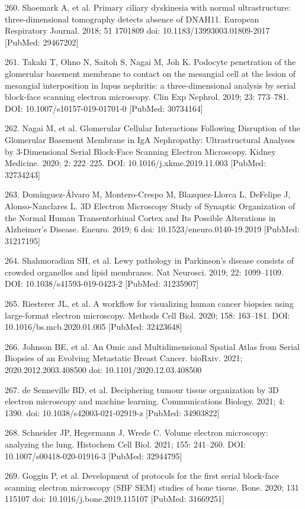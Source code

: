 \documentclass{article}
\begin{document}
\begin{hangpars}
260. Shoemark A, et al. Primary ciliary dyskinesia with normal ultrastructure: three-dimensional tomography detects absence of DNAH11. European Respiratory Journal. 2018; 51 1701809 doi: 10.1183/13993003.01809-2017 [PubMed: 29467202]

261. Takaki T, Ohno N, Saitoh S, Nagai M, Joh K. Podocyte penetration of the glomerular basement membrane to contact on the mesangial cell at the lesion of mesangial interposition in lupus nephritis: a three-dimensional analysis by serial block-face scanning electron microscopy. Clin Exp Nephrol. 2019; 23: 773–781. DOI: 10.1007/s10157-019-01701-0 [PubMed: 30734164]

262. Nagai M, et al. Glomerular Cellular Interactions Following Disruption of the Glomerular Basement Membrane in IgA Nephropathy: Ultrastructural Analyses by 3-Dimensional Serial Block-Face Scanning Electron Microscopy. Kidney Medicine. 2020; 2: 222–225. DOI: 10.1016/j.xkme.2019.11.003 [PubMed: 32734243]

263. Domínguez-Álvaro M, Montero-Crespo M, Blazquez-Llorca L, DeFelipe J, Alonso-Nanclares L. 3D Electron Microscopy Study of Synaptic Organization of the Normal Human Transentorhinal Cortex and Its Possible Alterations in Alzheimer’s Disease. Eneuro. 2019; 6 doi: 10.1523/eneuro.0140-19.2019 [PubMed: 31217195]

264. Shahmoradian SH, et al. Lewy pathology in Parkinson’s disease consists of crowded organelles and lipid membranes. Nat Neurosci. 2019; 22: 1099–1109. DOI: 10.1038/s41593-019-0423-2 [PubMed: 31235907]

265. Riesterer JL, et al. A workflow for visualizing human cancer biopsies using large-format electron microscopy. Methods Cell Biol. 2020; 158: 163–181. DOI: 10.1016/bs.mcb.2020.01.005 [PubMed: 32423648]

266. Johnson BE, et al. An Omic and Multidimensional Spatial Atlas from Serial Biopsies of an Evolving Metastatic Breast Cancer. bioRxiv. 2021; 2020.2012.2003.408500 doi: 10.1101/2020.12.03.408500

267. de Senneville BD, et al. Deciphering tumour tissue organization by 3D electron microscopy and machine learning. Communications Biology. 2021; 4: 1390. doi: 10.1038/s42003-021-02919-z [PubMed: 34903822]

268. Schneider JP, Hegermann J, Wrede C. Volume electron microscopy: analyzing the lung. Histochem Cell Biol. 2021; 155: 241–260. DOI: 10.1007/s00418-020-01916-3 [PubMed: 32944795]

269. Goggin P, et al. Development of protocols for the first serial block-face scanning electron microscopy (SBF SEM) studies of bone tissue. Bone. 2020; 131 115107 doi: 10.1016/j.bone.2019.115107 [PubMed: 31669251]


\end{hangpars}
\end{document}
